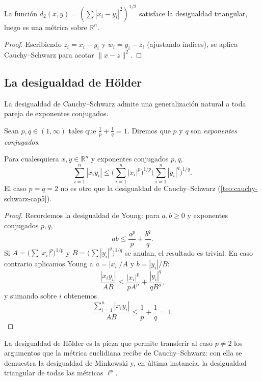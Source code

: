 \begin{corollary}
\label{cor:euclidiana-metrica}
La función $d_2(x,y)=(\sum|x_i-y_i|^2)^{1/2}$ satisface la desigualdad triangular, luego es una métrica sobre $\mathbb{R}^n$.
\end{corollary}
\begin{proof}
Escribiendo $z_i=x_i-y_i$ y $w_i=y_i-z_i$ (ajustando índices), se aplica Cauchy--Schwarz para acotar $\|x-z\|^2$.
\end{proof}

\subsection{La desigualdad de Hölder}

La desigualdad de Cauchy--Schwarz admite una generalización natural a toda pareja de exponentes conjugados.

\begin{definition}
\label{def:exponentes-conjugados}
Sean $p,q\in(1,\infty)$ tales que $\frac{1}{p}+\frac{1}{q}=1$. Diremos que $p$ y $q$ son \emph{exponentes conjugados}.
\end{definition}

\begin{theorem}
\label{teo:holder-rn}
Para cualesquiera $x,y\in\mathbb{R}^n$ y exponentes conjugados $p,q$,
\[
  \sum_{i=1}^{n}|x_i y_i|\leq\biggl(\sum_{i=1}^{n}|x_i|^p\biggr)^{1/p}\biggl(\sum_{i=1}^{n}|y_i|^q\biggr)^{1/q}.
\]
El caso $p=q=2$ no es otro que la desigualdad de Cauchy--Schwarz (\cref{teo:cauchy-schwarz-cap5}).
\end{theorem}
\begin{proof}
Recordemos la desigualdad de Young: para $a,b\geq 0$ y exponentes conjugados $p,q$,
\[
  ab\leq\frac{a^p}{p}+\frac{b^q}{q}.
\]
Si $A=\bigl(\sum|x_i|^p\bigr)^{1/p}$ y $B=\bigl(\sum|y_i|^q\bigr)^{1/q}$ se anulan, el resultado es trivial. En caso contrario aplicamos Young a $a=|x_i|/A$ y $b=|y_i|/B$:
\[
  \frac{|x_i y_i|}{AB}\leq\frac{|x_i|^p}{pA^p}+\frac{|y_i|^q}{qB^q},
\]
y sumando sobre $i$ obtenemos
\[
  \frac{\sum_{i=1}^{n}|x_i y_i|}{AB}\leq\frac{1}{p}+\frac{1}{q}=1.
\]
\end{proof}

La desigualdad de Hölder es la pieza que permite transferir al caso $p\neq 2$ los argumentos que la métrica euclidiana recibe de Cauchy--Schwarz: con ella se demuestra la desigualdad de Minkowski y, en última instancia, la desigualdad triangular de todas las métricas $\ell^p$.

